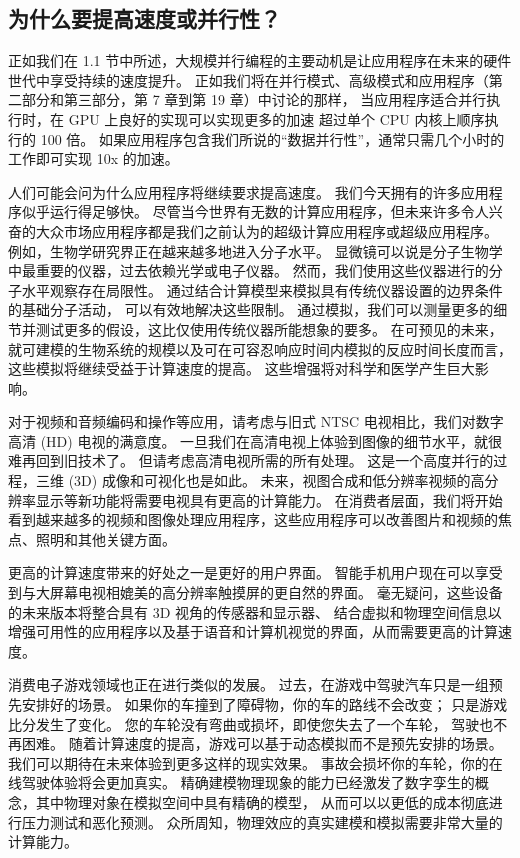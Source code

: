 \subsection{为什么要提高速度或并行性？}
正如我们在 1.1 节中所述，大规模并行编程的主要动机是让应用程序在未来的硬件世代中享受持续的速度提升。 
正如我们将在并行模式、高级模式和应用程序（第二部分和第三部分，第 7 章到第 19 章）中讨论的那样，
当应用程序适合并行执行时，在 GPU 上良好的实现可以实现更多的加速 超过单个 CPU 内核上顺序执行的 100 倍。 
如果应用程序包含我们所说的“数据并行性”，通常只需几个小时的工作即可实现 10x 的加速。

人们可能会问为什么应用程序将继续要求提高速度。 我们今天拥有的许多应用程序似乎运行得足够快。 
尽管当今世界有无数的计算应用程序，但未来许多令人兴奋的大众市场应用程序都是我们之前认为的超级计算应用程序或超级应用程序。 
例如，生物学研究界正在越来越多地进入分子水平。 显微镜可以说是分子生物学中最重要的仪器，过去依赖光学或电子仪器。 
然而，我们使用这些仪器进行的分子水平观察存在局限性。 通过结合计算模型来模拟具有传统仪器设置的边界条件的基础分子活动，
可以有效地解决这些限制。 通过模拟，我们可以测量更多的细节并测试更多的假设，这比仅使用传统仪器所能想象的要多。 
在可预见的未来，就可建模的生物系统的规模以及可在可容忍响应时间内模拟的反应时间长度而言，这些模拟将继续受益于计算速度的提高。 
这些增强将对科学和医学产生巨大影响。

对于视频和音频编码和操作等应用，请考虑与旧式 NTSC 电视相比，我们对数字高清 (HD) 电视的满意度。 
一旦我们在高清电视上体验到图像的细节水平，就很难再回到旧技术了。 但请考虑高清电视所需的所有处理。 
这是一个高度并行的过程，三维 (3D) 成像和可视化也是如此。 
未来，视图合成和低分辨率视频的高分辨率显示等新功能将需要电视具有更高的计算能力。 
在消费者层面，我们将开始看到越来越多的视频和图像处理应用程序，这些应用程序可以改善图片和视频的焦点、照明和其他关键方面。

更高的计算速度带来的好处之一是更好的用户界面。 智能手机用户现在可以享受到与大屏幕电视相媲美的高分辨率触摸屏的更自然的界面。 
毫无疑问，这些设备的未来版本将整合具有 3D 视角的传感器和显示器、
结合虚拟和物理空间信息以增强可用性的应用程序以及基于语音和计算机视觉的界面，从而需要更高的计算速度。

消费电子游戏领域也正在进行类似的发展。 过去，在游戏中驾驶汽车只是一组预先安排好的场景。 
如果你的车撞到了障碍物，你的车的路线不会改变； 只是游戏比分发生了变化。 您的车轮没有弯曲或损坏，即使您失去了一个车轮，
驾驶也不再困难。 随着计算速度的提高，游戏可以基于动态模拟而不是预先安排的场景。 
我们可以期待在未来体验到更多这样的现实效果。 事故会损坏你的车轮，你的在线驾驶体验将会更加真实。 
精确建模物理现象的能力已经激发了数字孪生的概念，其中物理对象在模拟空间中具有精确的模型，
从而可以以更低的成本彻底进行压力测试和恶化预测。 众所周知，物理效应的真实建模和模拟需要非常大量的计算能力。

